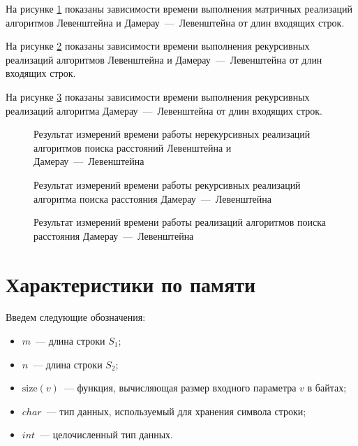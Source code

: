 На рисунке \ref{fig:nonrec-time} показаны зависимости времени выполнения матричных реализаций алгоритмов Левенштейна и Дамерау~---~Левенштейна от длин входящих строк.

На рисунке \ref{fig:rec-time} показаны зависимости времени выполнения рекурсивных реализаций алгоритмов Левенштейна и Дамерау~---~Левенштейна от длин входящих строк.

На рисунке \ref{fig:dl-all-time} показаны зависимости времени выполнения рекурсивных реализаций алгоритма Дамерау~---~Левенштейна от длин входящих строк.

\begin{figure}[H]
    \centering
    
    \caption{Результат измерений времени работы нерекурсивных реализаций алгоритмов поиска расстояний Левенштейна и Дамерау~---~Левенштейна}
    \label{fig:nonrec-time}
\end{figure}

\begin{figure}[H]
    \centering
    
    \caption{Результат измерений времени работы рекурсивных реализаций алгоритма поиска расстояния Дамерау~---~Левенштейна}
    \label{fig:rec-time}
\end{figure}

\begin{figure}[H]
    \centering
    
    \caption{Результат измерений времени работы реализаций алгоритмов поиска расстояния Дамерау~---~Левенштейна}
    \label{fig:dl-all-time}
\end{figure}

\section{Характеристики по памяти}

Введем следующие обозначения:

\begin{itemize}
    \item $m$~--- длина строки $S_1$;
    \item $n$~--- длина строки $S_2$;
    \item $\text{size}(v)$~--- функция, вычисляющая размер входного параметра $v$ в байтах;
    \item $char$~--- тип данных, используемый для хранения символа строки;
    \item $int$~--- целочисленный тип данных.
\end{itemize}

